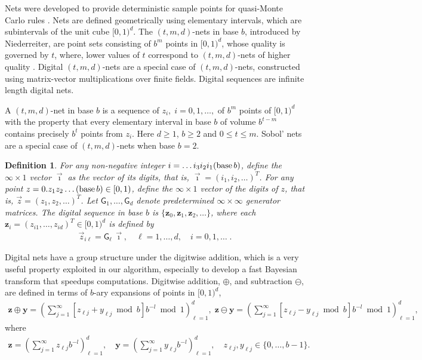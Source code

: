 \documentclass{iitthesis}          %
\newtheorem{defn}{Definition}
\newcommand{\bm}[1]{\boldsymbol{#1}}
\newcommand{\vy}{\bm{y}}
\newcommand{\vz}{\bm{z}}
\newcommand{\JRNote}[1]{{\textcolor{green}{JR: #1}}}
\begin{document}
Nets were developed to provide deterministic sample points for quasi-Monte Carlo rules \cite{Nie05a}. Nets are defined geometrically using elementary intervals, which are subintervals of the unit cube $[0,1)^d$.
The $(t,m, d)$-nets in base $b$, introduced by Niederreiter, are point sets consisting of $b^m$ points in $[0, 1)^d$, whose quality is governed by $t$, where, lower values of $t$ correspond to $(t,m, d)$-nets of higher quality \cite{Bald10a}.
Digital $(t,m, d)$-nets are a special case of $(t,m, d)$-nets, constructed using matrix-vector multiplications over finite fields. Digital sequences are infinite length digital nets.


A $(t,m,d)$-net in base $b$ is a sequence of $z_i, \; i=0,1,\dots,$ of $b^m$ points of $[0,1)^d$  
with the property that every elementary interval in base $b$ of volume $b^{t-m}$ contains precisely $b^t$ points from $z_i$. Here $d \ge 1$, $b\ge 2$ and $0 \le t \le m$. Sobol' nets \cite{Sob76} are a special case of $(t,m, d)$-nets when base $b=2$. 


\begin{defn}
For any non-negative integer $i = \dots i_3 i_2 i_1(\textup{base} \, b)$, define the $\infty \times 1$ vector $\vec{\imath}$ as the vector of its digits, that is, $\vec{\imath} = (i_1, i_2, \dots)^T$. 
For any point $z = 0.z_1 z_2 \dots (\textup{base}\, b) \in [0, 1)$, define the $\infty \times 1$ vector of the digits of $z$, that is, $\vec{z} = (z_1, z_2, \dots)^T$. 
Let $ \mathsf{G}_1, \dots , \mathsf{G}_d$ denote predetermined $\infty \times \infty$ generator matrices. 
The digital sequence in \textup{base} $b$ is $\{\vz_0, \vz_1, \vz_2, \dots\}$, where each $\vz_i = ( z_{i1}, \dots , z_{id})^T \in [0, 1)^d$ is defined by
\begin{align*}
\vec{z}_{i\ell} = \mathsf{G}_{\ell} \, \vec{\imath}, \quad \ell = 1, \dots, d, \quad i = 0, 1, \dots \;.
\end{align*}
\end{defn}



Digital nets have a group structure under the digitwise addition, which is a very useful property exploited in our algorithm, especially to develop a fast Bayesian transform that speedups computations.
Digitwise addition, $\oplus$, and subtraction $\ominus$, are defined in terms of $b$-ary expansions of points in $[0, 1)^d$,
\begin{align*}
\vz \oplus \vy = \left( \sum_{j=1}^\infty [z_{\ell j} + y_{\ell j} \bmod b] b^{-l} \bmod 1 \right)_{\ell=1}^d,
\;
\vz \ominus \vy = \left( \sum_{j=1}^\infty [z_{\ell j} - y_{\ell j} \bmod b] b^{-l} \bmod 1 \right)_{\ell=1}^d,
\end{align*}
where
\begin{align*}
\vz = \left( \sum_{j=1}^{\infty} z_{\ell j}b^{-l}\right)_{\ell=1}^d, \quad
\vy = \left( \sum_{j=1}^{\infty} y_{\ell j}b^{-l}\right)_{\ell=1}^d, \quad
z_{\ell j}, y_{\ell j} \in \{0,\dots,b-1\}.
\end{align*}
 
\end{document}
